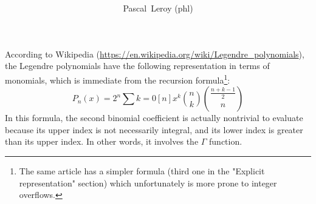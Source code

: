 \documentclass[10pt, a4paper, oneside]{basestyle}
\title{%
\textdisplay{%
Explicit representation of Legendre polynomials%
}%
}
\author{Pascal~Leroy (phl)}
\begin{document}
\maketitle
\noindent
According to Wikipedia (\url{https://en.wikipedia.org/wiki/Legendre_polynomials}), the Legendre polynomials have the following representation in terms of monomials, which is immediate from the recursion formula\footnote{The same article has a simpler formula (third one in the "Explicit representation" section) which unfortunately is more prone to integer overflows.}:
\begin{equation*}
P_n(x) = 2^n \sum{k = 0}[n] x^k \binom{n}{k} \binom{\frac{n + k - 1}{2}}{n}
\end{equation*}
In this formula, the second binomial coefficient is actually nontrivial to evaluate because its upper index is not necessarily integral, and its lower index is greater than its upper index.  In other words, it involves the $\Gamma$ function.
\end{document}
